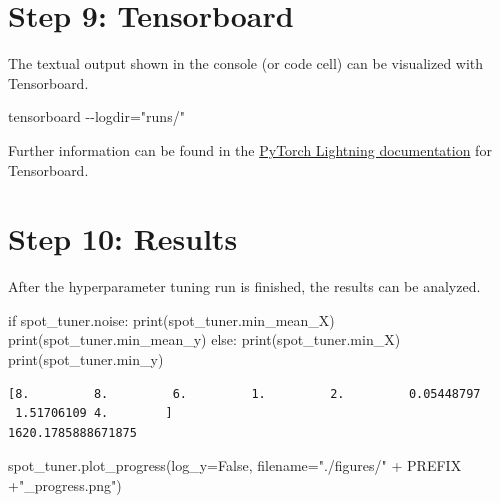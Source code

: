 \documentclass[
  letterpaper,
  DIV=11,
  numbers=noendperiod]{scrreprt}
\newenvironment{Shaded}{\begin{snugshade}}{\end{snugshade}}
\newcommand{\BuiltInTok}[1]{\textcolor[rgb]{0.00,0.23,0.31}{#1}}
\newcommand{\ControlFlowTok}[1]{\textcolor[rgb]{0.00,0.23,0.31}{#1}}
\newcommand{\NormalTok}[1]{\textcolor[rgb]{0.00,0.23,0.31}{#1}}
\newcommand{\OperatorTok}[1]{\textcolor[rgb]{0.37,0.37,0.37}{#1}}
\newcommand{\StringTok}[1]{\textcolor[rgb]{0.13,0.47,0.30}{#1}}
\newcommand{\VariableTok}[1]{\textcolor[rgb]{0.07,0.07,0.07}{#1}}
\begin{document}
\section{Step 9: Tensorboard}\label{sec-tensorboard-33}

The textual output shown in the console (or code cell) can be visualized
with Tensorboard.

\begin{Shaded}
\begin{Highlighting}[]
\NormalTok{tensorboard {-}{-}logdir="runs/"}
\end{Highlighting}
\end{Shaded}

Further information can be found in the
\href{https://lightning.ai/docs/pytorch/stable/api/lightning.pytorch.loggers.tensorboard.html}{PyTorch
Lightning documentation} for Tensorboard.

\section{Step 10: Results}\label{sec-results-33}

After the hyperparameter tuning run is finished, the results can be
analyzed.

\begin{Shaded}
\begin{Highlighting}[]
\ControlFlowTok{if}\NormalTok{ spot\_tuner.noise:}
    \BuiltInTok{print}\NormalTok{(spot\_tuner.min\_mean\_X)}
    \BuiltInTok{print}\NormalTok{(spot\_tuner.min\_mean\_y)}
\ControlFlowTok{else}\NormalTok{:}
    \BuiltInTok{print}\NormalTok{(spot\_tuner.min\_X)}
    \BuiltInTok{print}\NormalTok{(spot\_tuner.min\_y)}
\end{Highlighting}
\end{Shaded}

\begin{verbatim}
[8.         8.         6.         1.         2.         0.05448797
 1.51706109 4.        ]
1620.1785888671875
\end{verbatim}

\begin{Shaded}
\begin{Highlighting}[]
\NormalTok{spot\_tuner.plot\_progress(log\_y}\OperatorTok{=}\VariableTok{False}\NormalTok{,}
\NormalTok{    filename}\OperatorTok{=}\StringTok{"./figures/"} \OperatorTok{+}\NormalTok{ PREFIX }\OperatorTok{+}\StringTok{"\_progress.png"}\NormalTok{)}
\end{Highlighting}
\end{Shaded}
\end{document}

